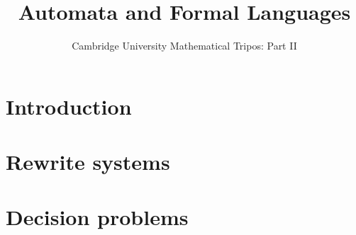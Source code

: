 \documentclass{article}
\title{Automata and Formal Languages}
\author{Cambridge University Mathematical Tripos: Part II}
\begin{document}
\maketitle

\tableofcontentsnewpage{}

\section{Introduction}

\section{Rewrite systems}

\section{Decision problems}

\end{document}
